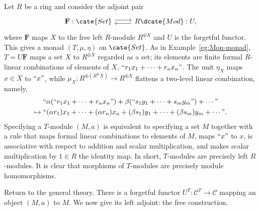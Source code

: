 \begin{example}\label{eg:Mod-monad}
	Let $R$ be a ring and consider the adjoint pair
	\[\begin{tikzcd}
		\mathbf{F}: \cate{Set} \arrow[r, shift left] & R\dcate{Mod}: U, \arrow[l, shift left]
	\end{tikzcd}\]
	where $\mathbf{F}$ maps $X$ to the free left $R$-module
	$R^{\oplus X}$ and $U$ is the forgetful functor. This gives a monad
	$(T,\mu,\eta)$ on $\cate{Set}$. As in Example~\ref{eg:Mon-monad},
	$T=U\mathbf{F}$ maps a set $X$ to $R^{\oplus X}$ regarded as a set; its
	elements are finite formal $R$-linear combinations of elements of $X$,
	$\text{\textquotedblleft} r_1x_1+\cdots+r_nx_n
	\text{\textquotedblright}$. The unit $\eta_X$ maps $x\in X$ to
	$\text{\textquotedblleft}x\text{\textquotedblright}$, while
	$\mu_X:R^{\oplus(R^{\oplus}X)}\to R^{\oplus X}$ flattens a two-level
	linear combination, namely,
	\begin{multline*}
		\text{\textquotedblleft} \alpha (\text{\textquotedblleft} r_1 x_1 + \cdots + r_n x_n \text{\textquotedblright}) + \beta (\text{\textquotedblleft} s_1 y_1 + \cdots + s_m y_m \text{\textquotedblright}) + \cdots \text{\textquotedblright} \\
		\mapsto \text{\textquotedblleft} (\alpha r_1) x_1 + \cdots + (\alpha r_n) x_n + (\beta s_1) y_1 + \cdots + (\beta s_m) y_m + \cdots \text{\textquotedblright} .
	\end{multline*}
	Specifying a $T$-module $(M,a)$ is equivalent to specifying a set $M$
	together with a rule that maps formal linear combinations to elements of
	$M$, maps $\text{\textquotedblleft}x\text{\textquotedblright}$ to $x$, is
	associative with respect to addition and scalar multiplication, and makes
	scalar multiplication by $1\in R$ the identity map. In short, $T$-modules
	are precisely left $R$-modules. It is clear that morphisms of $T$-modules
	are precisely module homomorphisms.
\end{example}

Return to the general theory. There is a forgetful functor
$U^T:\mathcal{C}^T\to\mathcal{C}$ mapping an object $(M,a)$ to $M$. We now
give its left adjoint: the free construction.

